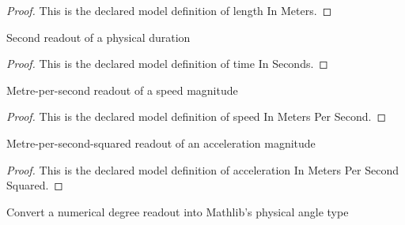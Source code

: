 \begin{proof}
  This is the declared model definition of length In Meters.
\end{proof}
\begin{definition}
  \label{def:physics:phyx-mini-0739:phyxminiproblems-problemphyxmini0739-timeinseconds}
  Second readout of a physical duration
\end{definition}
\begin{proof}
  This is the declared model definition of time In Seconds.
\end{proof}
\begin{definition}
  \label{def:physics:phyx-mini-0739:phyxminiproblems-problemphyxmini0739-speedinmeterspersecond}
  Metre-per-second readout of a speed magnitude
\end{definition}
\begin{proof}
  This is the declared model definition of speed In Meters Per Second.
\end{proof}
\begin{definition}
  \label{def:physics:phyx-mini-0739:phyxminiproblems-problemphyxmini0739-accelerationinmeterspersecondsquared}
  Metre-per-second-squared readout of an acceleration magnitude
\end{definition}
\begin{proof}
  This is the declared model definition of acceleration In Meters Per Second Squared.
\end{proof}
\begin{definition}[degrees]
  \label{def:physics:phyx-mini-0739:phyxminiproblems-problemphyxmini0739-degrees}
  Convert a numerical degree readout into Mathlib's physical angle type
\end{definition}
